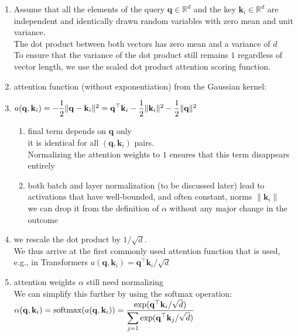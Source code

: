 \begin{enumerate}[itemsep=0.15cm]
    \item Assume that all the elements of the query $\mathbf{q} \in \mathbb{R}^d$ and the key $\mathbf{k}_i \in \mathbb{R}^d$ are independent and identically drawn random variables with zero mean and unit variance.\\
    The dot product between both vectors has zero mean and a variance of $d$\\
    To ensure that the variance of the dot product still remains $1$ regardless of vector length, we use the scaled dot product attention scoring function.

    \item attention function (without exponentiation) from the Gaussian kernel: 
    \item[] $
        \hfill
        a(\mathbf{q}, \mathbf{k}_i) = -\dfrac{1}{2} \|\mathbf{q} - \mathbf{k}_i\|^2  = \mathbf{q}^\top \mathbf{k}_i -\dfrac{1}{2} \|\mathbf{k}_i\|^2  -\dfrac{1}{2} \|\mathbf{q}\|^2
        \hfill
    $
    \begin{enumerate}
        \item final term depends on $\mathbf{q}$ only\\
        it is identical for all $(\mathbf{q}, \mathbf{k}_i)$ pairs.\\
        Normalizing the attention weights to $1$ ensures that this term disappears entirely

        \item both batch and layer normalization (to be discussed later) lead to activations that have well-bounded, and often constant, norms $\|\mathbf{k}_i\|$\\
        we can drop it from the definition of $\alpha$ without any major change in the outcome

        
    \end{enumerate}

    \item we rescale the dot product by $1/\sqrt{d}$. \\
    We thus arrive at the first commonly used attention function that is used, e.g., in Transformers $a(\mathbf{q}, \mathbf{k}_i) = \mathbf{q}^\top \mathbf{k}_i / \sqrt{d}$

    \item attention weights $\alpha$ still need normalizing\\
    We can simplify this further by using the softmax operation:
    $
        \alpha(\mathbf{q}, \mathbf{k}_i) = \mathrm{softmax}(a(\mathbf{q}, \mathbf{k}_i)) = \dfrac{\exp(\mathbf{q}^\top \mathbf{k}_i / \sqrt{d})}{\displaystyle\sum_{j=1} \exp(\mathbf{q}^\top \mathbf{k}_j / \sqrt{d})}
    $
\end{enumerate}


